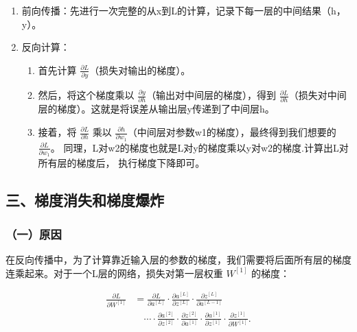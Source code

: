 \begin{enumerate}
\def\labelenumi{\arabic{enumi}.}
\tightlist
\item
  前向传播：先进行一次完整的从x到L的计算，记录下每一层的中间结果（h，y）。
\item
  反向计算：

  \begin{enumerate}
  \def\labelenumii{\alph{enumii}.}
  \tightlist
  \item
    首先计算 \(\frac{\partial L}{\partial y}\)（损失对输出的梯度）。
  \item
    然后，将这个梯度乘以 \(\frac{\partial y}{\partial h}\)（输出对中间层的梯度），得到 \(\frac{\partial L}{\partial h}\)（损失对中间层的梯度）。这就是将误差从输出层y传递到了中间层h。
  \item
    接着，将 \(\frac{\partial L}{\partial h}\) 乘以 \(\frac{\partial h}{\partial w_1}\)（中间层对参数w1的梯度），最终得到我们想要的 \(\frac{\partial L}{\partial w_1}\)。
    同理，L对w2的梯度也就是L对y的梯度乘以y对w2的梯度.计算出L对所有层的梯度后， 执行梯度下降即可。
  \end{enumerate}
\end{enumerate}

\hypertarget{ux4e09ux68afux5ea6ux6d88ux5931ux548cux68afux5ea6ux7206ux70b8}{%
\subsection{三、梯度消失和梯度爆炸}\label{ux4e09ux68afux5ea6ux6d88ux5931ux548cux68afux5ea6ux7206ux70b8}}

\hypertarget{ux4e00ux539fux56e0}{%
\subsubsection{（一）原因}\label{ux4e00ux539fux56e0}}

在反向传播中，为了计算靠近输入层的参数的梯度，我们需要将后面所有层的梯度连乘起来。对于一个L层的网络，损失对第一层权重 \(W^{[1]}\) 的梯度：

\[
\begin{aligned}
\frac{\partial L}{\partial W^{[1]}}
&=
\frac{\partial L}{\partial a^{[L]}}
\cdot
\frac{\partial a^{[L]}}{\partial z^{[L]}}
\cdot
\frac{\partial z^{[L]}}{\partial a^{[L-1]}} \\
&\quad \cdots
\cdot
\frac{\partial a^{[2]}}{\partial z^{[2]}}
\cdot
\frac{\partial z^{[2]}}{\partial a^{[1]}}
\cdot
\frac{\partial a^{[1]}}{\partial z^{[1]}}
\cdot
\frac{\partial z^{[1]}}{\partial W^{[1]}} .
\end{aligned}
\]

